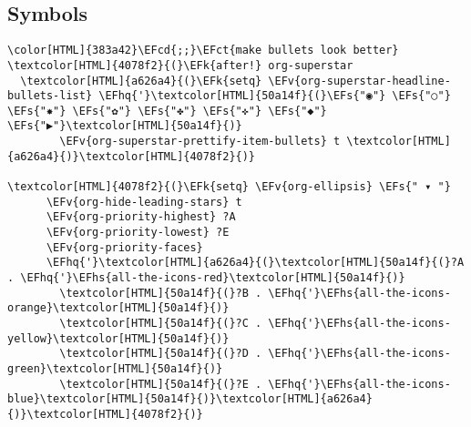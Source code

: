 \documentclass{scrartcl}
\newcommand{\EFk}[1]{\textcolor{EFk}{#1}} %
\newcommand{\EFs}[1]{\textcolor{EFs}{#1}} %
\newcommand{\EFct}[1]{\textcolor{EFct}{#1}} %
\newcommand{\EFv}[1]{\textcolor{EFv}{#1}} %
\newcommand{\EFcd}[1]{\textcolor{EFcd}{#1}} %
\newcommand{\EFhq}[1]{\textcolor{EFhq}{#1}} %
\newcommand{\EFhs}[1]{\textcolor{EFhs}{#1}} %
\begin{document}
\subsection{Symbols}
\label{sec:org47765c3}
\begin{Code}
\begin{Verbatim}[]
\color[HTML]{383a42}\EFcd{;;}\EFct{make bullets look better}
\textcolor[HTML]{4078f2}{(}\EFk{after!} org-superstar
  \textcolor[HTML]{a626a4}{(}\EFk{setq} \EFv{org-superstar-headline-bullets-list} \EFhq{'}\textcolor[HTML]{50a14f}{(}\EFs{"◉"} \EFs{"○"} \EFs{"✸"} \EFs{"✿"} \EFs{"✤"} \EFs{"✜"} \EFs{"◆"} \EFs{"▶"}\textcolor[HTML]{50a14f}{)}
        \EFv{org-superstar-prettify-item-bullets} t \textcolor[HTML]{a626a4}{)}\textcolor[HTML]{4078f2}{)}

\textcolor[HTML]{4078f2}{(}\EFk{setq} \EFv{org-ellipsis} \EFs{" ▾ "}
      \EFv{org-hide-leading-stars} t
      \EFv{org-priority-highest} ?A
      \EFv{org-priority-lowest} ?E
      \EFv{org-priority-faces}
      \EFhq{'}\textcolor[HTML]{a626a4}{(}\textcolor[HTML]{50a14f}{(}?A . \EFhq{'}\EFhs{all-the-icons-red}\textcolor[HTML]{50a14f}{)}
        \textcolor[HTML]{50a14f}{(}?B . \EFhq{'}\EFhs{all-the-icons-orange}\textcolor[HTML]{50a14f}{)}
        \textcolor[HTML]{50a14f}{(}?C . \EFhq{'}\EFhs{all-the-icons-yellow}\textcolor[HTML]{50a14f}{)}
        \textcolor[HTML]{50a14f}{(}?D . \EFhq{'}\EFhs{all-the-icons-green}\textcolor[HTML]{50a14f}{)}
        \textcolor[HTML]{50a14f}{(}?E . \EFhq{'}\EFhs{all-the-icons-blue}\textcolor[HTML]{50a14f}{)}\textcolor[HTML]{a626a4}{)}\textcolor[HTML]{4078f2}{)}


\end{Verbatim}
\end{Code}
\end{document}
